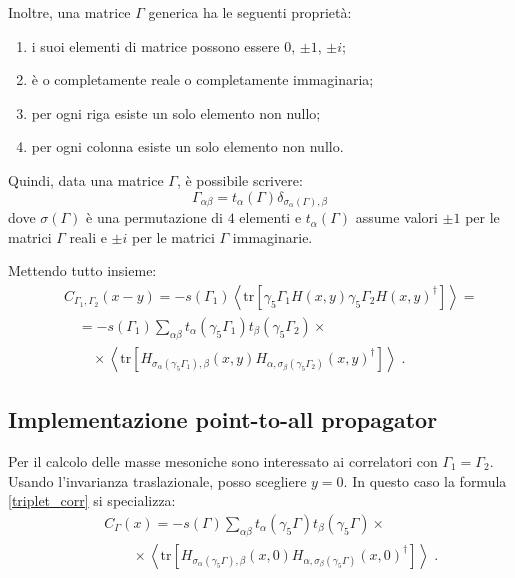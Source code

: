 \documentclass[a4paper]{article}
\newcommand{\tr}{\mathrm{tr}}
\newcommand{\point}{\; .}
\begin{document}
Inoltre, una matrice $\Gamma$ generica ha le seguenti propriet\`{a}:
\begin{enumerate}
\item i suoi elementi di matrice possono essere $0$, $\pm 1$, $\pm i$;
\item \`{e} o completamente reale o completamente immaginaria;
\item per ogni riga esiste un solo elemento non nullo;
\item per ogni colonna esiste un solo elemento non nullo.
\end{enumerate}
Quindi, data una matrice $\Gamma$, \`{e} possibile scrivere:
\begin{equation} \label{gamma_ab}
\Gamma_{\alpha\beta} = t_\alpha(\Gamma) \delta_{\sigma_\alpha(\Gamma), \beta}
\end{equation}
dove $\sigma(\Gamma)$ \`{e} una permutazione di $4$ elementi e $t_\alpha(\Gamma)$ assume valori $\pm 1$ per le matrici $\Gamma$ reali e $\pm i$ per le matrici $\Gamma$ immaginarie.

Mettendo tutto insieme:
\begin{eqnarray}
&& C_{\Gamma_1,\Gamma_2}(x-y) = - s(\Gamma_1) \left< \tr
\left[ \gamma_5 \Gamma_1 H(x,y) \gamma_5 \Gamma_2 H(x,y)^\dagger \right]
\right> = \nonumber \\
&& \quad = - s(\Gamma_1) \sum_{\alpha\beta} t_\alpha(\gamma_5 \Gamma_1) t_\beta(\gamma_5 \Gamma_2) \times \nonumber \\
&& \qquad \times \left< \tr
\left[ H_{\sigma_\alpha(\gamma_5 \Gamma_1), \beta}(x,y) H_{\alpha, \sigma_\beta(\gamma_5 \Gamma_2)}(x,y)^\dagger \right]
\right> \point \label{triplet_corr}
\end{eqnarray}


\subsection{Implementazione point-to-all propagator}

Per il calcolo delle masse mesoniche sono interessato ai correlatori con $\Gamma_1=\Gamma_2$. Usando l'invarianza traslazionale, posso scegliere $y=0$. In questo caso la formula \ref{triplet_corr} si specializza:
\begin{eqnarray}
&& C_{\Gamma}(x) = - s(\Gamma) \sum_{\alpha\beta} t_\alpha(\gamma_5 \Gamma) t_\beta(\gamma_5 \Gamma) \times \nonumber \\
&& \qquad \times \left< \tr
\left[ H_{\sigma_\alpha(\gamma_5 \Gamma), \beta}(x,0) H_{\alpha, \sigma_\beta(\gamma_5 \Gamma)}(x,0)^\dagger \right]
\right> \point \label{triplet_point_to_all_corr}
\end{eqnarray}
\end{document}
